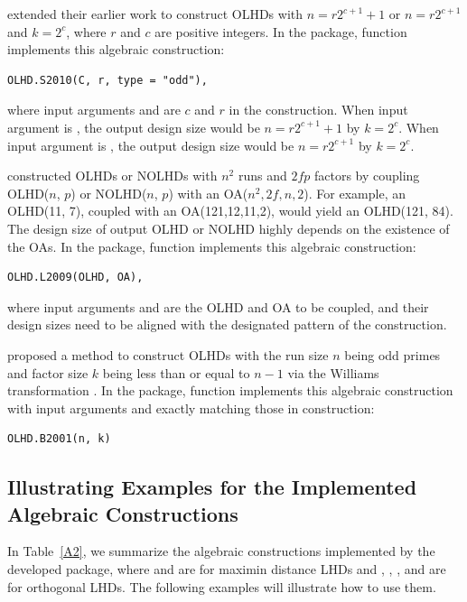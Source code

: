 \cite{sun2010construction} extended their earlier work \citep{sun2009construction} to construct OLHDs with $n=r2^{c+1}+1$ or $n=r2^{c+1}$ and $k=2^c$, where $r$ and $c$ are positive integers. In the  package, function  implements this algebraic construction:
{\small
	\begin{verbatim}
OLHD.S2010(C, r, type = "odd"),
	\end{verbatim}
}

\noindent where input arguments  and  are $c$ and $r$ in the construction. When input argument  is , the output design size would be $n=r2^{c+1}+1$ by $k=2^c$. When input argument  is , the output design size would be $n=r2^{c+1}$ by $k=2^c$.

\cite{lin2009construction} constructed OLHDs or NOLHDs with $n^2$ runs and $2fp$ factors by coupling OLHD($n$, $p$) or NOLHD($n$, $p$) with an OA($n^2,2f,n,2$). For example, an OLHD(11, 7), coupled with an OA(121,12,11,2), would yield an OLHD(121, 84). The design size of output OLHD or NOLHD highly depends on the existence of the OAs. In the  package, function  implements this algebraic construction:
{\small
	\begin{verbatim}
OLHD.L2009(OLHD, OA),
	\end{verbatim}
}

\noindent where input arguments  and  are the OLHD and OA to be coupled, and their design sizes need to be aligned with the designated pattern of the construction.

\cite{butler2001optimal} proposed a method to construct OLHDs with the run size $n$ being odd primes and factor size $k$ being less than or equal to $n-1$ via the Williams transformation \citep{williams1949experimental}. In the  package, function  implements this algebraic construction with input arguments  and  exactly matching those in construction:
{\small
	\begin{verbatim}
OLHD.B2001(n, k)
	\end{verbatim}
}

\subsection{Illustrating Examples for the Implemented Algebraic Constructions}

In Table~\ref{A2}, we summarize the algebraic constructions implemented by the developed  package, where  and  are for maximin distance LHDs and , , ,  and  are for orthogonal LHDs. The following examples will illustrate how to use them.

